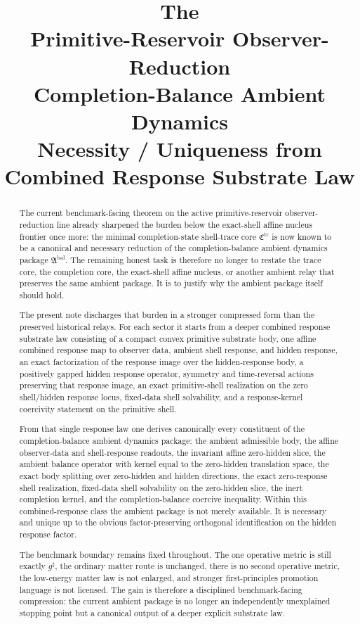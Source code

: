 \documentclass[11pt]{article}
\title{\textbf{The \TheoryName{}}\\[0.4em]
\large Primitive-Reservoir Observer-Reduction\\
\large Completion-Balance Ambient Dynamics\\
\large Necessity / Uniqueness from Combined Response Substrate Law}
\author{}
\date{}
\newcommand{\CompletedMetric}{g^{\sharp}}
\newcommand{\AmbientPackage}{\mathfrak A^{\mathrm{bal}}}
\newcommand{\TraceCore}{\mathfrak C^{\mathrm{tr}}}
\begin{document}
\maketitle

\begin{abstract}
The current benchmark-facing theorem on the active primitive-reservoir observer-reduction line already sharpened the burden below the exact-shell affine nucleus frontier once more: the minimal completion-state shell-trace core \(\TraceCore\) is now known to be a canonical and necessary reduction of the completion-balance ambient dynamics package \(\AmbientPackage\). The remaining honest task is therefore no longer to restate the trace core, the completion core, the exact-shell affine nucleus, or another ambient relay that preserves the same ambient package. It is to justify why the ambient package itself should hold.

The present note discharges that burden in a stronger compressed form than the preserved historical relays. For each sector it starts from a deeper combined response substrate law consisting of a compact convex primitive substrate body, one affine combined response map to observer data, ambient shell response, and hidden response, an exact factorization of the response image over the hidden-response body, a positively gapped hidden response operator, symmetry and time-reversal actions preserving that response image, an exact primitive-shell realization on the zero shell/hidden response locus, fixed-data shell solvability, and a response-kernel coercivity statement on the primitive shell.

From that single response law one derives canonically every constituent of the completion-balance ambient dynamics package: the ambient admissible body, the affine observer-data and shell-response readouts, the invariant affine zero-hidden slice, the ambient balance operator with kernel equal to the zero-hidden translation space, the exact body splitting over zero-hidden and hidden directions, the exact zero-response shell realization, fixed-data shell solvability on the zero-hidden slice, the inert completion kernel, and the completion-balance coercive inequality. Within this combined-response class the ambient package is not merely available. It is necessary and unique up to the obvious factor-preserving orthogonal identification on the hidden response factor.

The benchmark boundary remains fixed throughout. The one operative metric is still exactly \(\CompletedMetric\), the ordinary matter route is unchanged, there is no second operative metric, the low-energy matter law is not enlarged, and stronger first-principles promotion language is not licensed. The gain is therefore a disciplined benchmark-facing compression: the current ambient package is no longer an independently unexplained stopping point but a canonical output of a deeper explicit substrate law.
\end{abstract}
\end{document}
